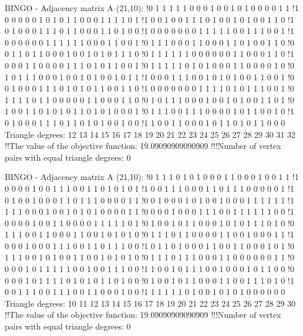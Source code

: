 BINGO - Adjacency matrix A (21,10):
!0 1 1 1 1 1 0 0 0 1 0 0 1 0 1 0 0 0 0 1 1 
!1 0 0 0 0 0 1 0 1 0 1 1 0 0 0 1 1 1 1 0 1 
!1 0 0 1 0 0 1 1 1 0 1 0 0 1 0 1 0 0 1 1 0 
!1 0 1 0 0 0 1 1 1 0 1 1 0 0 0 1 1 0 1 0 0 
!1 0 0 0 0 0 0 0 1 1 1 1 1 0 0 1 1 1 0 0 1 
!1 0 0 0 0 0 0 1 1 1 1 1 1 0 0 0 1 1 0 0 1 
!0 1 1 1 0 0 0 1 1 0 0 0 1 1 0 1 0 0 1 1 0 
!0 0 1 1 0 1 1 0 0 0 1 0 0 1 0 1 0 1 1 1 0 
!0 1 1 1 1 1 1 0 0 0 0 0 0 1 1 0 0 0 1 1 0 
!1 0 0 0 1 1 0 0 0 0 1 1 1 0 1 0 1 1 0 0 1 
!0 1 1 1 1 1 0 1 0 1 0 0 0 1 1 0 0 0 0 1 0 
!0 1 0 1 1 1 0 0 0 1 0 0 1 0 1 0 0 1 0 1 1 
!1 0 0 0 1 1 1 0 0 1 0 1 0 1 0 0 1 1 0 0 1 
!0 0 1 0 0 0 1 1 1 0 1 0 1 0 1 1 0 0 1 1 0 
!1 0 0 0 0 0 0 0 1 1 1 1 0 1 0 1 1 1 0 0 1 
!0 1 1 1 1 0 1 1 0 0 0 0 0 1 1 0 0 0 1 1 0 
!0 1 0 1 1 1 0 0 0 1 0 0 1 0 1 0 0 1 1 0 1 
!0 1 0 0 1 1 0 1 0 1 0 1 1 0 1 0 1 0 0 0 1 
!0 1 1 1 0 0 1 1 1 0 0 0 0 1 0 1 1 0 0 1 0 
!1 0 1 0 0 0 1 1 1 0 1 1 0 1 0 1 0 0 1 0 0 
!1 1 0 0 1 1 0 0 0 1 0 1 1 0 1 0 1 1 0 0 0 
Triangle degrees:
12 13 14 15 16 17 18 19 20 21 22 23 24 25 26 27 28 29 30 31 32 
!!The value of the objective function: 19.09090909090909
!!!Number of vertex pairs with equal triangle degrees: 0


BINGO - Adjacency matrix A (21,10):
!0 1 1 1 0 1 0 1 0 0 0 1 1 0 0 0 1 0 0 1 1 
!1 0 0 0 0 1 0 0 1 1 1 0 0 1 1 0 1 0 1 0 1 
!1 0 0 1 1 1 0 0 0 1 1 0 1 1 1 0 0 0 0 0 1 
!1 0 1 0 0 1 0 0 0 1 1 0 1 1 1 0 0 0 0 1 1 
!0 0 1 0 0 0 1 0 1 0 0 1 0 0 0 1 1 1 1 1 1 
!1 1 1 1 0 0 0 1 0 0 1 0 1 0 1 0 0 0 0 1 1 
!0 0 0 0 1 0 0 0 1 1 1 0 0 1 1 1 1 1 1 0 0 
!1 0 0 0 0 1 0 0 1 1 0 0 0 0 1 1 1 1 1 0 1 
!0 1 0 0 1 0 1 1 0 0 0 1 0 1 0 1 1 1 0 1 0 
!0 1 1 1 0 0 1 1 0 0 0 1 1 0 0 1 0 1 0 1 0 
!0 1 1 1 0 1 1 0 0 0 0 1 1 0 0 1 0 0 0 1 1 
!1 0 0 0 1 0 0 0 1 1 1 0 0 1 1 0 1 1 1 0 0 
!1 0 1 1 0 1 0 0 0 1 1 0 0 1 1 0 0 0 1 0 1 
!0 1 1 1 0 0 1 0 1 0 0 1 1 0 0 1 0 1 0 1 0 
!0 1 1 1 0 1 1 1 0 0 0 1 1 0 0 0 0 0 0 1 1 
!0 0 0 0 1 0 1 1 1 1 1 0 0 1 0 0 1 1 1 0 0 
!1 1 0 0 1 0 1 1 1 0 0 1 0 0 0 1 0 1 1 0 0 
!0 0 0 0 1 0 1 1 1 1 0 1 0 1 0 1 1 0 1 0 0 
!0 1 0 0 1 0 1 1 0 0 0 1 1 0 0 1 1 1 0 1 0 
!1 0 0 1 1 1 0 0 1 1 1 0 0 1 1 0 0 0 1 0 0 
!1 1 1 1 1 1 0 1 0 0 1 0 1 0 1 0 0 0 0 0 0 
Triangle degrees:
10 11 12 13 14 15 16 17 18 19 20 21 22 23 24 25 26 27 28 29 30 
!!The value of the objective function: 19.09090909090909
!!!Number of vertex pairs with equal triangle degrees: 0


